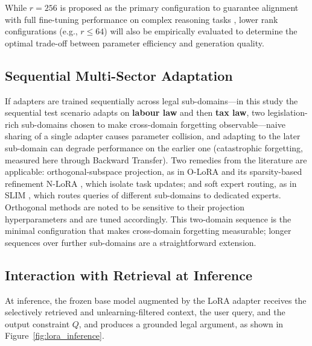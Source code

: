 While $r=256$ is proposed as the primary configuration to guarantee alignment with full fine-tuning performance on complex reasoning tasks \parencite{biderman2024loralearnsforgets}, lower rank configurations (e.g., $r \le 64$) will also be empirically evaluated to determine the optimal trade-off between parameter efficiency and generation quality.

\subsection{Sequential Multi-Sector Adaptation}
If adapters are trained sequentially across legal sub-domains---in this study the sequential test scenario adapts on \textbf{labour law} and then \textbf{tax law}, two legislation-rich sub-domains chosen to make cross-domain forgetting observable---naive sharing of a single adapter causes parameter collision, and adapting to the later sub-domain can degrade performance on the earlier one (catastrophic forgetting, measured here through Backward Transfer). Two remedies from the literature are applicable: orthogonal-subspace projection, as in O-LoRA \parencite{wang-etal-2023-orthogonal} and its sparsity-based refinement N-LoRA \parencite{yang2024parametercollisionhinderingcontinual}, which isolate task updates; and soft expert routing, as in SLIM \parencite{han-etal-2025-slim}, which routes queries of different sub-domains to dedicated experts. Orthogonal methods are noted to be sensitive to their projection hyperparameters and are tuned accordingly. This two-domain sequence is the minimal configuration that makes cross-domain forgetting measurable; longer sequences over further sub-domains are a straightforward extension.

\subsection{Interaction with Retrieval at Inference}
At inference, the frozen base model augmented by the LoRA adapter receives the selectively retrieved and unlearning-filtered context, the user query, and the output constraint $Q$, and produces a grounded legal argument, as shown in Figure~\ref{fig:lora_inference}.

